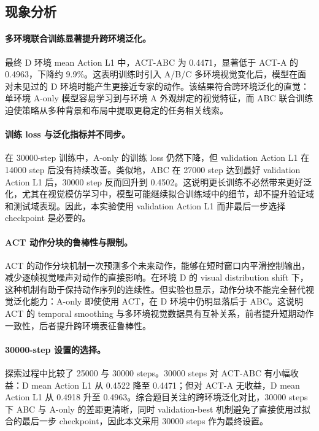 \documentclass[11pt,UTF8,fontset=fandol]{ctexart}
\newcommand{\methodA}{ACT-A}
\newcommand{\methodABC}{ACT-ABC}
\newcommand{\actlone}{Action L1}
\begin{document}
\subsection{现象分析}
\paragraph{多环境联合训练显著提升跨环境泛化。}
最终 D 环境 mean \actlone{} 中，\methodABC{} 为 0.4471，显著低于 \methodA{} 的 0.4963，下降约 9.9\%。这表明训练时引入 A/B/C 多环境视觉变化后，模型在面对未见过的 D 环境时能产生更接近专家的动作。该结果符合跨环境泛化的直觉：单环境 A-only 模型容易学习到与环境 A 外观绑定的视觉特征，而 ABC 联合训练迫使策略从多种背景和布局中提取更稳定的任务相关线索。

\paragraph{训练 loss 与泛化指标并不同步。}
在 30000-step 训练中，A-only 的训练 loss 仍然下降，但 validation \actlone{} 在 14000 step 后没有持续改善。类似地，ABC 在 27000 step 达到最好 validation \actlone{} 后，30000 step 反而回升到 0.4502。这说明更长训练不必然带来更好泛化，尤其在视觉模仿学习中，模型可能继续拟合训练域中的细节，却不提升验证域和测试域表现。因此，本实验使用 validation \actlone{} 而非最后一步选择 checkpoint 是必要的。

\paragraph{ACT 动作分块的鲁棒性与限制。}
ACT 的动作分块机制一次预测多个未来动作，能够在短时窗口内平滑控制输出，减少逐帧视觉噪声对动作的直接影响。在环境 D 的 visual distribution shift 下，这种机制有助于保持动作序列的连续性。但实验也显示，动作分块不能完全替代视觉泛化能力：A-only 即使使用 ACT，在 D 环境中仍明显落后于 ABC。这说明 ACT 的 temporal smoothing 与多环境视觉数据具有互补关系，前者提升短期动作一致性，后者提升跨环境表征鲁棒性。

\paragraph{30000-step 设置的选择。}
探索过程中比较了 25000 与 30000 steps。30000 steps 对 \methodABC{} 有小幅收益：D mean \actlone{} 从 0.4522 降至 0.4471；但对 \methodA{} 无收益，D mean \actlone{} 从 0.4918 升至 0.4963。综合题目关注的跨环境泛化对比，30000 steps 下 ABC 与 A-only 的差距更清晰，同时 validation-best 机制避免了直接使用过拟合的最后一步 checkpoint，因此本文采用 30000 steps 作为最终设置。
\end{document}

